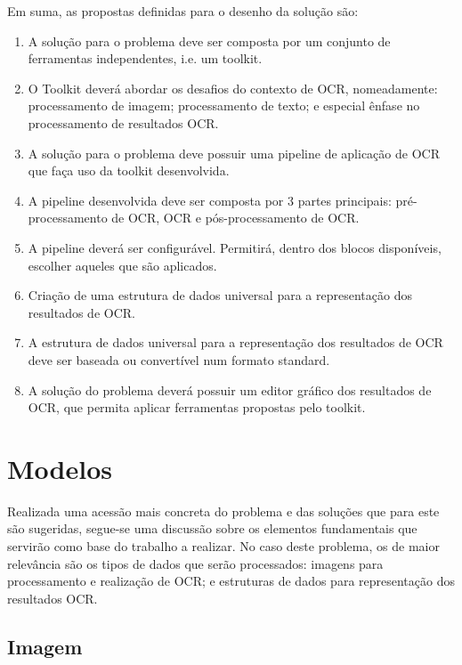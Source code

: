 
Em suma, as propostas definidas para o desenho da solução são:

\begin{enumerate}[label=\textbf{\arabic*}]\setlength\itemsep{-0.8em}
	\item A solução para o problema deve ser composta por um conjunto de ferramentas independentes, i.e. um toolkit.
	\item O Toolkit deverá abordar os desafios do contexto de OCR, nomeadamente: processamento de imagem; processamento de texto; e especial ênfase no processamento de resultados OCR.
	\item A solução para o problema deve possuir uma pipeline de aplicação de OCR que faça uso da toolkit desenvolvida.
	\item A pipeline desenvolvida deve ser composta por 3 partes principais: pré-processamento de OCR, OCR e pós-processamento de OCR.
	\item A pipeline deverá ser configurável. Permitirá, dentro dos blocos disponíveis, escolher aqueles que são aplicados.
	\item Criação de uma estrutura de dados universal para a representação dos resultados de OCR.
	\item A estrutura de dados universal para a representação dos resultados de OCR deve ser baseada ou convertível num formato standard.
	\item A solução do problema deverá possuir um editor gráfico dos resultados de OCR, que permita aplicar ferramentas propostas pelo toolkit.
\end{enumerate}


\section{Modelos}

Realizada uma acessão mais concreta do problema e das soluções que para este são sugeridas, segue-se uma discussão sobre os elementos fundamentais que servirão como base do trabalho a realizar. No caso deste problema, os de maior relevância são os tipos de dados que serão processados: imagens para processamento e realização de OCR; e estruturas de dados para representação dos resultados OCR.

\subsection{Imagem}

